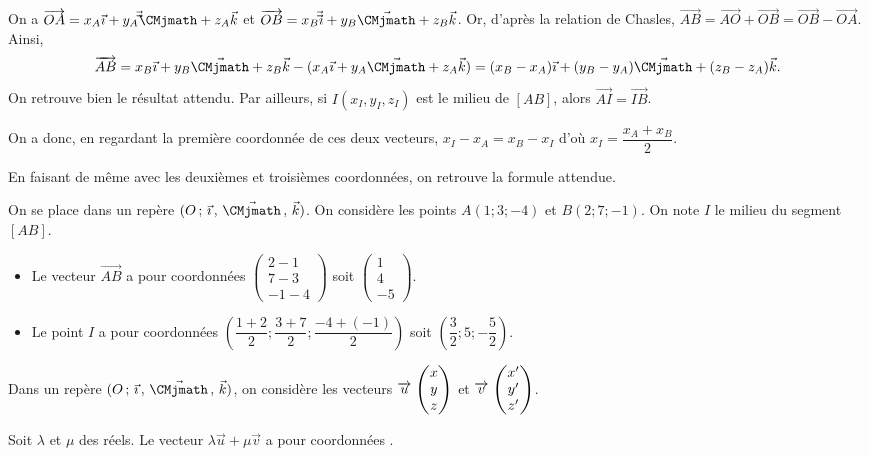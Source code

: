 \documentclass[11pt,fleqn, openany]{book} %
\begin{document}
\begin{demonstration}On a $\overrightarrow{OA}=x_A\vec {\imath} + y_A \vec \vec {\CMjmath} + z_A \vec k$ et $\overrightarrow{OB}=x_B\vec \vec {\imath} + y_B \vec {\CMjmath} + z_B \vec k$. Or, d'après la relation de Chasles, $\overrightarrow{AB}=\overrightarrow{AO}+\overrightarrow{OB}=\overrightarrow{OB}- \overrightarrow{OA}$. Ainsi,
\[\overrightarrow{AB} = x_B\vec {\imath} + y_B \vec {\CMjmath} + z_B \vec k - (x_A\vec {\imath} + y_A \vec {\CMjmath} + z_A \vec k)=(x_B-x_A)\vec {\imath} + (y_B-y_A)\vec {\CMjmath} + (z_B - z_A)\vec k.\]
On retrouve bien le résultat attendu. Par ailleurs, si $I(x_I,y_I,z_I)$ est le milieu de $[AB]$, alors $\overrightarrow{AI}=\overrightarrow{IB}$. 

On a donc, en regardant la première coordonnée de ces deux vecteurs, $x_I - x_A = x_B - x_I$ d'où $x_I=\dfrac{x_A+x_B}{2}$. 

En faisant de même avec les deuxièmes et troisièmes coordonnées, on retrouve la formule attendue.\end{demonstration}

\begin{example}On se place dans un repère $\Oijk$. On considère les points $A(1;3;-4)$ et $B(2;7;-1)$. On note $I$ le milieu du segment $[AB]$.
\begin{itemize}
\item Le vecteur $\overrightarrow{AB}$ a pour coordonnées $\renewcommand{\arraystretch}{1}\renewcommand{\arraystretch}{1}\begin{pmatrix}2-1 \\ 7-3 \\ -1-4\end{pmatrix}$ soit $\renewcommand{\arraystretch}{1}\renewcommand{\arraystretch}{1}\begin{pmatrix}1 \\ 4 \\ -5\end{pmatrix}$.
\item Le point $I$ a pour coordonnées $\left( \dfrac{1+2}{2} ; \dfrac{3+7}{2} ; \dfrac{-4+(-1)}{2} \right)$ soit $\left(\dfrac{3}{2};5;-\dfrac{5}{2}\right)$.
\end{itemize}\end{example}

\begin{proposition}Dans un repère  $\Oijk$, on considère les vecteurs $\renewcommand{\arraystretch}{1}\coorde{u}{x}{y}{z}$ et $\renewcommand{\arraystretch}{1}\coorde{v}{x'}{y'}{z'}$. 

Soit $\lambda$ et $\mu$ des réels. Le vecteur $\lambda \vec u + \mu \vec v$ a pour coordonnées \renewcommand{\arraystretch}{1}.\end{proposition}
\end{document}

